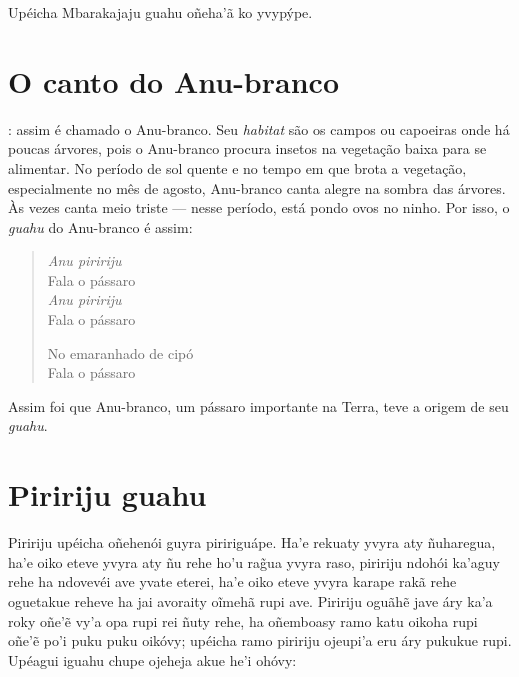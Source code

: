 Upéicha Mbarakajaju guahu oñeha'ã ko yvypýpe.

\chapter{O canto do Anu-branco}

: assim é chamado o Anu-branco. Seu \textit{habitat} são os campos
ou capoeiras onde há poucas árvores, pois o Anu-branco procura insetos
na vegetação baixa para se alimentar. No período de sol quente e no
tempo em que brota a vegetação, especialmente no mês de agosto,
Anu-branco canta alegre na sombra das árvores. Às vezes canta meio
triste --- nesse período, está pondo ovos no ninho. Por isso, o
\textit{guahu} do Anu-branco é assim:

\begin{verse}
\textit{Anu piririju}\footnotemark{}\\
Fala o pássaro\\
\textit{Anu piririju}\\
Fala o pássaro

No emaranhado de cipó\footnotemark{}\\
Fala o pássaro
\end{verse}




Assim foi que Anu-branco, um pássaro importante na Terra, teve a origem
de seu \textit{guahu}.

\chapter{Piririju guahu}

 Piririju upéicha oñehenói guyra piririguápe. Ha'e rekuaty yvyra
aty ñuharegua, ha'e oiko eteve yvyra aty ñu rehe ho'u rag̃ua yvyra raso,
piririju ndohói ka'aguy rehe ha ndovevéi ave yvate eterei, ha'e oiko
eteve yvyra karape rakã rehe oguetakue reheve ha jai avoraity oĩmehã
rupi ave. Piririju oguãhẽ jave áry ka'a roky oñe'ẽ vy'a opa rupi rei
ñuty rehe, ha oñemboasy ramo katu oikoha rupi oñe'ẽ po'i puku puku
oikóvy; upéicha ramo piririju ojeupi'a eru áry pukukue rupi. Upéagui
iguahu chupe ojeheja akue he'i ohóvy:

